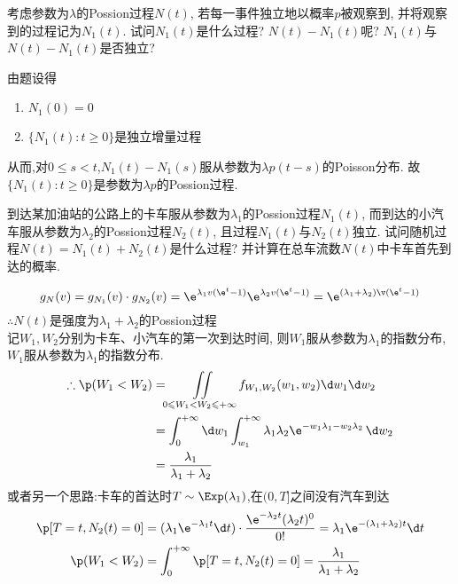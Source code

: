 \begin{problem}{2.9}
考虑参数为$\lambda$的Possion过程$N(t)$, 若每一事件独立地以概率$p$被观察到, 并将观察到的过程记为$N_1(t)$. 试问$N_1(t)$是什么过程? $N(t)-N_1(t)$呢? $N_1(t)$与$N(t) - N_1(t)$是否独立?
\end{problem}
\begin{solution}
	由题设得
	\begin{enumerate}[label=(\roman*)]
		\item $N_1(0)=0$
		\item $\{N_1(t):t\geqslant 0\}$是独立增量过程
	\end{enumerate}
	从而,对$0\leqslant s<t$,$N_1(t)-N_1(s)$服从参数为$\lambda p(t-s)$的Poisson分布.
	故$\{N_1(t):t\geqslant 0\}$是参数为$\lambda p$的Possion过程.
\end{solution}

\begin{problem}{2.10}
到达某加油站的公路上的卡车服从参数为${\lambda}_1$的Possion过程$N_1(t)$, 而到达的小汽车服从参数为${\lambda}_2$的Possion过程$N_2(t)$, 且过程$N_1(t)$与$N_2(t)$独立. 试问随机过程$N(t) = N_1(t) + N_2(t)$是什么过程? 并计算在总车流数$N(t)$中卡车首先到达的概率.
\end{problem}
\begin{solution}
	\[g_N(v)  = g_{N_1}(v) \cdot g_{N_2}(v) = \e^{\lambda_1 v(\e^t-1)}\e^{\lambda_2 v(\e^t-1)} = \e^{(\lambda_1 +\lambda_2)\v(\e^t-1)}\]
	$\therefore N(t)$是强度为$\lambda_1+\lambda_2$的Possion过程\\
	记$W_1,W_2$分别为卡车、小汽车的第一次到达时间, 则$W_1$服从参数为$\lambda_1$的指数分布, $W_1$服从参数为$\lambda_1$的指数分布.
	\[\begin{split}
			\therefore \p(W_1 < W_2) & = \iint\limits_{0 \leqslant W_1 < W_2 \leqslant +\infty}f_{W_1,W_2}(w_1,w_2)\d w_1\d w_2\\
			& = \int^{+\infty}_0\d w_1\int^{+\infty}_{w_1}\lambda_1\lambda_2\e^{-w_1\lambda_1-w_2\lambda_2}\,\d w_2\\
			& = \frac{\lambda_1}{\lambda_1+\lambda_2}
		\end{split}\]
	或者另一个思路:卡车的首达时$T\sim \Exp(\lambda_1)$,在$(0,T]$之间没有汽车到达
	\[\begin{aligned}
			\p[T=t,N_2(t)=0] & = (\lambda_1 \e^{-\lambda_1 t}\d t)\cdot \frac{\e^{-\lambda_2 t}(\lambda_2 t)^0}{0!} = \lambda_1 \e^{-(\lambda_1+\lambda_2)t}\d t \\
			\p(W_1<W_2)      & = \int_{0}^{+\infty}\p[T=t,N_2(t)=0] = \frac{\lambda_1}{\lambda_1+\lambda_2}
		\end{aligned}\]
\end{solution}

